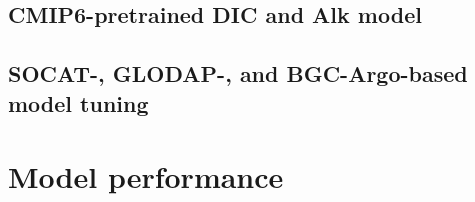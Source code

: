 \documentclass{article}
\begin{document}
	\subsection{CMIP6-pretrained DIC and Alk model}
	\subsection{SOCAT-, GLODAP-, and BGC-Argo-based model tuning}
	\section{Model performance}
	\medskip
	
	
	
\end{document}
